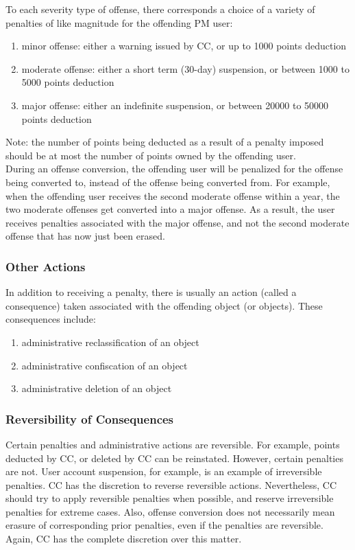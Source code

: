 To each severity type of offense, there corresponds a choice of a variety of penalties of like magnitude for the offending PM user:
\begin{enumerate}
\item minor offense: either a warning issued by CC, or up to 1000 points deduction
\item moderate offense: either a short term (30-day) suspension, or between 1000 to 5000 points deduction
\item major offense: either an indefinite suspension, or between 20000 to 50000 points deduction
\end{enumerate}
Note: the number of points being deducted as a result of a penalty imposed should be at most the number of points owned by the offending user.\\

During an offense conversion, the offending user will be penalized for the offense being converted to, instead of the offense being converted from. For example, when the offending user receives the second moderate offense within a year, the two moderate offenses get converted into a major offense. As a result, the user receives penalties associated with the major offense, and not the second moderate offense that has now just been erased.\\

\subsubsection*{Other Actions}
In addition to receiving a penalty, there is usually an action (called a consequence) taken associated with the offending object (or objects). These consequences include:
\begin{enumerate}
\item administrative reclassification of an object
\item administrative confiscation of an object
\item administrative deletion of an object
\end{enumerate}

\subsubsection*{Reversibility of Consequences}
Certain penalties and administrative actions are reversible. For example, points deducted by CC, or deleted by CC can be reinstated. However, certain penalties are not. User account suspension, for example, is an example of irreversible penalties. CC has the discretion to reverse reversible actions. Nevertheless, CC should try to apply reversible penalties when possible, and reserve irreversible penalties for extreme cases. Also, offense conversion does not necessarily mean erasure of corresponding prior penalties, even if the penalties are reversible. Again, CC has the complete discretion over this matter.


